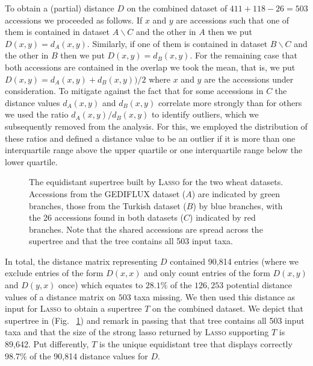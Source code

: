 To obtain a (partial) distance $D$ on the combined dataset of $411+118-26=503$
accessions we proceeded as follows. If $x$ and $y$ are accessions such that
one of them is contained in dataset $A\backslash C$ and the other in $A$ then
we put $D(x,y)=d_A(x,y)$. Similarly, if one of them is contained in dataset
$B\backslash C$ and the other in $B$ then we put $D(x,y)=d_B(x,y)$. For the
remaining case that both accessions are contained in the overlap we took the
mean, that is, we put $D(x,y)=d_A(x,y)+d_B(x,y))/2$ where $x$ and $y$ are the
accessions under consideration.  To mitigate against the fact that for some
accessions in $C$ the distance values $d_A(x,y)$ and $d_B(x,y)$ correlate more
strongly than for others we used the ratio $d_A(x,y)/d_B(x,y)$ to identify
outliers, which we subsequently removed from the analysis. For this, we
employed the distribution of these ratios and defined a distance value to be
an outlier if it is more than one interquartile range above the upper quartile
or one interquartile range below the lower quartile.

\begin{figure}
  \centering {}
  \caption{The equidistant supertree built by \textsc{Lasso} for the two wheat
    datasets. Accessions from the GEDIFLUX dataset ($A$) are indicated by
    green branches, those from the Turkish dataset ($B$) by blue branches,
    with the 26 accessions found in both datasets ($C$) indicated by red
    branches. Note that the shared accessions are spread across the supertree
    and that the tree contains all 503 input taxa.}
  \label{fig:wheat-supertree}
\end{figure}

In total, the distance matrix representing $D$ contained 90,814 entries (where
we exclude entries of the form $D(x,x)$ and only count entries of the form
$D(x,y)$ and $D(y,x)$ once) which equates to $28.1\%$ of the $126,253$
potential distance values of a distance matrix on $503$ taxa missing.  We then
used this distance as input for \textsc{Lasso} to obtain a supertree $T$ on
the combined dataset. We depict that supertree in (Fig.~
\ref{fig:wheat-supertree}) and remark in passing that that tree contains all
503 input taxa and that the size of the strong lasso returned by
\textsc{Lasso} supporting $T$ is 89,642. Put differently, $T$ is the unique
equidistant tree that displays correctly 98.7\% of the 90,814 distance values
for $D$.

